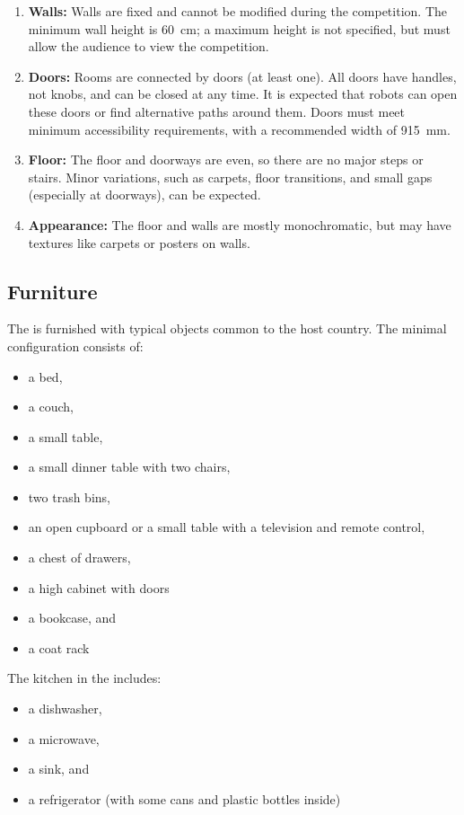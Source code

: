 \begin{enumerate}
	\item \textbf{Walls:} Walls are fixed and cannot be modified during the competition. The minimum wall height is \SI{60}{\centi\meter}; a maximum height is not specified, but must allow the audience to view the competition.
	\item \textbf{Doors:} Rooms are connected by doors (at least one). All doors have handles, not knobs, and can be closed at any time.
	It is expected that robots can open these doors or find alternative paths around them.
	Doors must meet minimum accessibility requirements, with a recommended width of \SI{915}{\milli\meter}.
	\item \textbf{Floor:} The floor and doorways are even, so there are no major steps or stairs. Minor variations, such as carpets, floor transitions, and small gaps (especially at doorways), can be expected.
	\item \textbf{Appearance:} The floor and walls are mostly monochromatic, but may have textures like carpets or posters on walls.
\end{enumerate}


\subsection{Furniture}\label{rule:scenario_furniture}

The \Arena{} is furnished with typical objects common to the host country.
The minimal configuration consists of:
\begin{itemize}
	\item a bed,
	\item a couch,
	\item a small table,
	\item a small dinner table with two chairs,
	\item two trash bins,
	\item an open cupboard or a small table with a television and remote control,
	\item a chest of drawers,
	\item a high cabinet with doors
	\item a bookcase, and
	\item a coat rack
\end{itemize}

The kitchen in the \Arena{} includes:
\begin{itemize}
	\item a dishwasher,
	\item a microwave,
	\item a sink, and
	\item a refrigerator (with some cans and plastic bottles inside)
\end{itemize}

